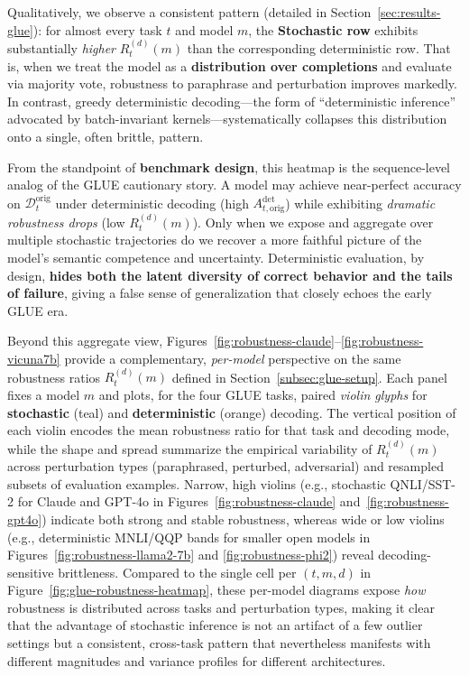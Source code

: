 Qualitatively, we observe a consistent pattern (detailed in
Section~\ref{sec:results-glue}): for almost every task $t$ and model
$m$, the \textbf{Stochastic row} exhibits substantially \emph{higher}
$R_t^{(d)}(m)$ than the corresponding deterministic row. That is, when
we treat the model as a \textbf{distribution over completions} and
evaluate via majority vote, robustness to paraphrase and perturbation
improves markedly. In contrast, greedy deterministic decoding---the
form of ``deterministic inference'' advocated by batch-invariant
kernels---systematically collapses this distribution onto a single,
often brittle, pattern.

From the standpoint of \textbf{benchmark design}, this heatmap is the
sequence-level analog of the GLUE cautionary story. A model may achieve
near-perfect accuracy on $\mathcal{D}_t^{\text{orig}}$ under deterministic
decoding (high $A_{t,\text{orig}}^{\text{det}}$) while exhibiting
\emph{dramatic robustness drops} (low $R_t^{(d)}(m)$). Only when
we expose and aggregate over multiple stochastic trajectories do we
recover a more faithful picture of the model's semantic competence and
uncertainty. Deterministic evaluation, by design, \textbf{hides both the
latent diversity of correct behavior and the tails of failure}, giving a
false sense of generalization that closely echoes the early GLUE era.



Beyond this aggregate view, Figures~\ref{fig:robustness-claude}--\ref{fig:robustness-vicuna7b}
provide a complementary, \emph{per-model} perspective on the same robustness ratios
$R_t^{(d)}(m)$ defined in Section~\ref{subsec:glue-setup}. Each panel fixes a model $m$
and plots, for the four GLUE tasks, paired \emph{violin glyphs} for \textbf{stochastic}
(teal) and \textbf{deterministic} (orange) decoding. The vertical position of each violin
encodes the mean robustness ratio for that task and decoding mode, while the shape and
spread summarize the empirical variability of $R_t^{(d)}(m)$ across perturbation types
(paraphrased, perturbed, adversarial) and resampled subsets of evaluation examples.
Narrow, high violins (e.g., stochastic QNLI/SST-2 for Claude and GPT-4o in
Figures~\ref{fig:robustness-claude} and~\ref{fig:robustness-gpt4o}) indicate both strong
and stable robustness, whereas wide or low violins (e.g., deterministic MNLI/QQP bands
for smaller open models in Figures~\ref{fig:robustness-llama2-7b} and
\ref{fig:robustness-phi2}) reveal decoding-sensitive brittleness. Compared to the single
cell per $(t,m,d)$ in Figure~\ref{fig:glue-robustness-heatmap}, these per-model diagrams
expose \emph{how} robustness is distributed across tasks and perturbation types, making it
clear that the advantage of stochastic inference is not an artifact of a few outlier
settings but a consistent, cross-task pattern that nevertheless manifests with different
magnitudes and variance profiles for different architectures.



